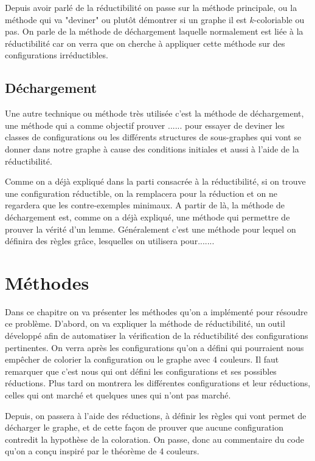 \documentclass[10pt,a4paper]{article}
\begin{document}
Depuis avoir parlé de la réductibilité on passe sur la méthode principale, ou la méthode qui va "deviner" ou plutôt démontrer si un graphe il est $k$-coloriable ou pas. On parle de la méthode de déchargement laquelle normalement est liée à la réductibilité car on verra que on cherche à appliquer cette méthode sur des configurations irréductibles.



\subsection{Déchargement}

Une autre technique ou méthode très utilisée c'est la méthode de déchargement, une méthode qui a comme objectif prouver ...... pour essayer de deviner les classes de configurations ou les différents structures de sous-graphes qui vont se donner dans notre graphe à cause des conditions initiales et aussi à l'aide de la réductibilité. 

Comme on a déjà expliqué dans la parti consacrée à la réductibilité, si on trouve une configuration réductible, on la remplacera pour la réduction et on ne regardera que les contre-exemples minimaux. A partir de là, la méthode de déchargement est, comme on a déjà expliqué, une méthode qui permettre de prouver la vérité d'un lemme. Généralement c'est une méthode pour lequel on définira des règles grâce, lesquelles on utilisera pour.......




\section{Méthodes}

Dans ce chapitre on va présenter les méthodes qu'on a implémenté pour résoudre ce problème. D'abord, on va expliquer la méthode de réductibilité, un outil développé afin de automatiser la vérification de la réductibilité des configurations pertinentes. On verra après les configurations qu'on a défini qui pourraient nous empêcher de colorier la configuration ou le graphe avec 4 couleurs. Il faut remarquer que c'est nous qui ont défini les configurations et ses possibles réductions. Plus tard on montrera les différentes configurations et leur réductions, celles qui ont marché et quelques unes qui n'ont pas marché. 

Depuis, on passera à l'aide des réductions, à définir les règles qui vont permet de décharger le graphe, et de cette façon de prouver que aucune configuration contredit la hypothèse de la coloration. On passe, donc au commentaire du code qu'on a conçu inspiré par le théorème de 4 couleurs.
\end{document}
